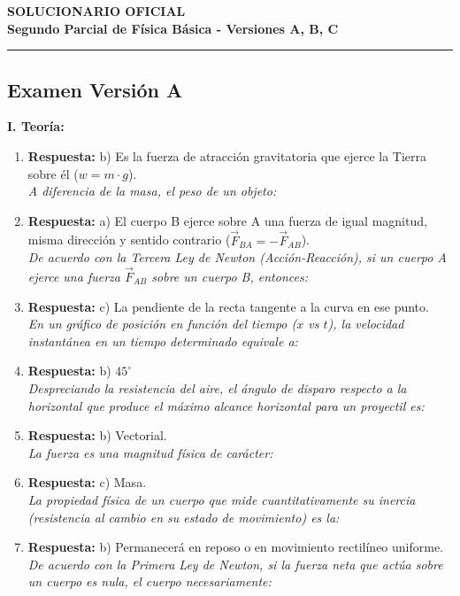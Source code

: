 \documentclass[11pt,a4paper]{article}
\begin{document}
\begin{center}
    \textbf{\Large SOLUCIONARIO OFICIAL} \\[0.2cm]
    \textbf{\large Segundo Parcial de Física Básica - Versiones A, B, C} \\[0.4cm]
\end{center}

\hrule
\vspace{0.4cm}
\subsection*{Examen Versión A}\textbf{I. Teoría:}\begin{enumerate}    \item \textbf{Respuesta:} b) Es la fuerza de atracción gravitatoria que ejerce la Tierra sobre él ($w = m \cdot g$). \\ \textit{A diferencia de la masa, el peso de un objeto:}
    \item \textbf{Respuesta:} a) El cuerpo B ejerce sobre A una fuerza de igual magnitud, misma dirección y sentido contrario ($\vec{F}_{BA} = -\vec{F}_{AB}$). \\ \textit{De acuerdo con la Tercera Ley de Newton (Acción-Reacción), si un cuerpo A ejerce una fuerza $\vec{F}_{AB}$ sobre un cuerpo B, entonces:}
    \item \textbf{Respuesta:} c) La pendiente de la recta tangente a la curva en ese punto. \\ \textit{En un gráfico de posición en función del tiempo ($x$ vs $t$), la velocidad instantánea en un tiempo determinado equivale a:}
    \item \textbf{Respuesta:} b) $45^\circ$ \\ \textit{Despreciando la resistencia del aire, el ángulo de disparo respecto a la horizontal que produce el máximo alcance horizontal para un proyectil es:}
    \item \textbf{Respuesta:} b) Vectorial. \\ \textit{La fuerza es una magnitud física de carácter:}
    \item \textbf{Respuesta:} c) Masa. \\ \textit{La propiedad física de un cuerpo que mide cuantitativamente su inercia (resistencia al cambio en su estado de movimiento) es la:}
    \item \textbf{Respuesta:} b) Permanecerá en reposo o en movimiento rectilíneo uniforme. \\ \textit{De acuerdo con la Primera Ley de Newton, si la fuerza neta que actúa sobre un cuerpo es nula, el cuerpo necesariamente:}

\end{enumerate}
\end{document}
